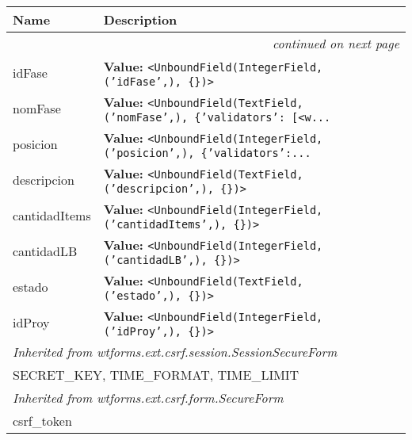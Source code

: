     \vspace{-1cm}
\hspace{\varindent}\begin{longtable}{|p{\varnamewidth}|p{\vardescrwidth}|l}
\cline{1-2}
\cline{1-2} \centering \textbf{Name} & \centering \textbf{Description}& \\
\cline{1-2}
\endhead\cline{1-2}\multicolumn{3}{r}{\small\textit{continued on next page}}\\\endfoot\cline{1-2}
\endlastfoot\raggedright i\-d\-F\-a\-s\-e\- & \raggedright \textbf{Value:} 
{\tt {\textless}UnboundField(IntegerField, ('idFase',), \{\}){\textgreater}}&\\
\cline{1-2}
\raggedright n\-o\-m\-F\-a\-s\-e\- & \raggedright \textbf{Value:} 
{\tt {\textless}UnboundField(TextField, ('nomFase',), \{'validators': [{\textless}w\texttt{...}}&\\
\cline{1-2}
\raggedright p\-o\-s\-i\-c\-i\-o\-n\- & \raggedright \textbf{Value:} 
{\tt {\textless}UnboundField(IntegerField, ('posicion',), \{'validators':\texttt{...}}&\\
\cline{1-2}
\raggedright d\-e\-s\-c\-r\-i\-p\-c\-i\-o\-n\- & \raggedright \textbf{Value:} 
{\tt {\textless}UnboundField(TextField, ('descripcion',), \{\}){\textgreater}}&\\
\cline{1-2}
\raggedright c\-a\-n\-t\-i\-d\-a\-d\-I\-t\-e\-m\-s\- & \raggedright \textbf{Value:} 
{\tt {\textless}UnboundField(IntegerField, ('cantidadItems',), \{\}){\textgreater}}&\\
\cline{1-2}
\raggedright c\-a\-n\-t\-i\-d\-a\-d\-L\-B\- & \raggedright \textbf{Value:} 
{\tt {\textless}UnboundField(IntegerField, ('cantidadLB',), \{\}){\textgreater}}&\\
\cline{1-2}
\raggedright e\-s\-t\-a\-d\-o\- & \raggedright \textbf{Value:} 
{\tt {\textless}UnboundField(TextField, ('estado',), \{\}){\textgreater}}&\\
\cline{1-2}
\raggedright i\-d\-P\-r\-o\-y\- & \raggedright \textbf{Value:} 
{\tt {\textless}UnboundField(IntegerField, ('idProy',), \{\}){\textgreater}}&\\
\cline{1-2}
\multicolumn{2}{|l|}{\textit{Inherited from wtforms.ext.csrf.session.SessionSecureForm}}\\
\multicolumn{2}{|p{\varwidth}|}{\raggedright SECRET\_KEY, TIME\_FORMAT, TIME\_LIMIT}\\
\cline{1-2}
\multicolumn{2}{|l|}{\textit{Inherited from wtforms.ext.csrf.form.SecureForm}}\\
\multicolumn{2}{|p{\varwidth}|}{\raggedright csrf\_token}\\
\cline{1-2}
\end{longtable}

